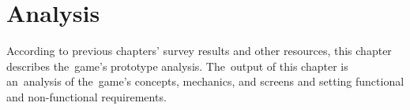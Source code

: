 \chapter{Analysis}
\label{analysis}

According to previous chapters' survey results and other resources, this chapter describes the~game's prototype analysis.
The~output of this chapter is an~analysis of the~game's concepts, mechanics, and screens and setting functional and non-functional requirements.




